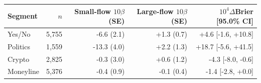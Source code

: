 \begin{tabular}{lrrrr}
\toprule
Segment & $n$ & \thead{Small-flow\\$10\beta$ (SE)} & \thead{Large-flow\\$10\beta$ (SE)} & \thead{$10^4\Delta$Brier\\{[95.0\% CI]}} \\
\midrule
Yes/No & 5,755 & -6.6 (2.1) & +1.3 (0.7) & +4.6 [-1.6, +10.8] \\
Politics & 1,559 & -13.3 (4.0) & +2.2 (1.3) & +18.7 [-5.6, +41.5] \\
Crypto & 2,825 & -0.3 (3.0) & +0.6 (1.2) & -4.3 [-8.0, -0.6] \\
Moneyline & 5,376 & -0.4 (0.9) & -0.1 (0.4) & -1.4 [-2.8, +0.0] \\
\bottomrule
\end{tabular}
